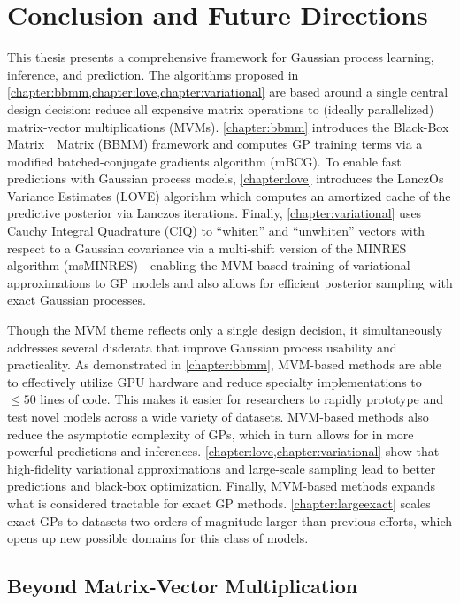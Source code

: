 \chapter{Conclusion and Future Directions}
\label{chapter:discussion}


This thesis presents a comprehensive framework for Gaussian process learning, inference, and prediction.
The algorithms proposed in \cref{chapter:bbmm,chapter:love,chapter:variational} are based around a single central design decision: reduce all expensive matrix operations to (ideally parallelized) matrix-vector multiplications (MVMs).
\cref{chapter:bbmm} introduces the Black-Box Matrix~\texttimes~Matrix (BBMM) framework and computes GP training terms via a modified batched-conjugate gradients algorithm (mBCG).
To enable fast predictions with Gaussian process models, \cref{chapter:love} introduces the LanczOs Variance Estimates (LOVE) algorithm which computes an amortized cache of the predictive posterior via Lanczos iterations.
Finally, \cref{chapter:variational} uses Cauchy Integral Quadrature (CIQ) to ``whiten'' and ``unwhiten'' vectors with respect to a Gaussian covariance via a multi-shift version of the MINRES algorithm (msMINRES)---enabling
the MVM-based training of variational approximations to GP models and also allows for efficient posterior sampling with exact Gaussian processes.

Though the MVM theme reflects only a single design decision, it simultaneously addresses several disderata that improve Gaussian process usability and practicality.
As demonstrated in \cref{chapter:bbmm}, MVM-based methods are able to effectively utilize GPU hardware and reduce specialty implementations to $\leq 50$ lines of code.
This makes it easier for researchers to rapidly prototype and test novel models across a wide variety of datasets.
MVM-based methods also reduce the asymptotic complexity of GPs, which in turn allows for in more powerful predictions and inferences.
\cref{chapter:love,chapter:variational} show that high-fidelity variational approximations and large-scale sampling lead to better predictions and black-box optimization.
Finally, MVM-based methods expands what is considered tractable for exact GP methods.
\cref{chapter:largeexact} scales exact GPs to datasets two orders of magnitude larger than previous efforts, which opens up new possible domains for this class of models.



\section{Beyond Matrix-Vector Multiplication}

